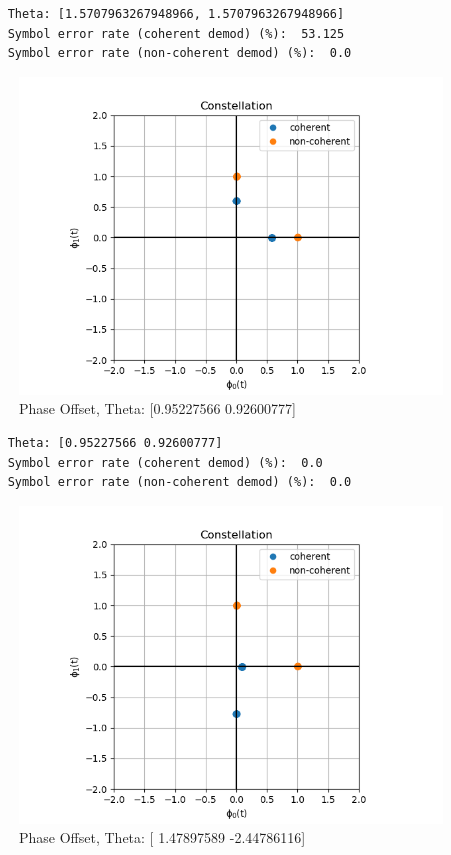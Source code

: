 \documentclass[
	letterpaper, %
	10pt, %
]{CSUniSchoolLabReport}
\begin{document}
\begin{lstlisting}
	Theta: [1.5707963267948966, 1.5707963267948966]
	Symbol error rate (coherent demod) (%):  53.125
	Symbol error rate (non-coherent demod) (%):  0.0
\end{lstlisting}

\begin{figure}[H] %
	\centering %
	\includegraphics[width=1.2\textwidth]{phase_offset2.png} %
	\caption{Phase Offset, Theta: [0.95227566 0.92600777]}
	\label{fig:block}
\end{figure}

\begin{lstlisting}
	Theta: [0.95227566 0.92600777]
	Symbol error rate (coherent demod) (%):  0.0
	Symbol error rate (non-coherent demod) (%):  0.0
\end{lstlisting}

\begin{figure}[H] %
	\centering %
	\includegraphics[width=1.2\textwidth]{phase_offset3.png} %
	\caption{Phase Offset, Theta: [ 1.47897589 -2.44786116]}
	\label{fig:block}
\end{figure}
\end{document}
